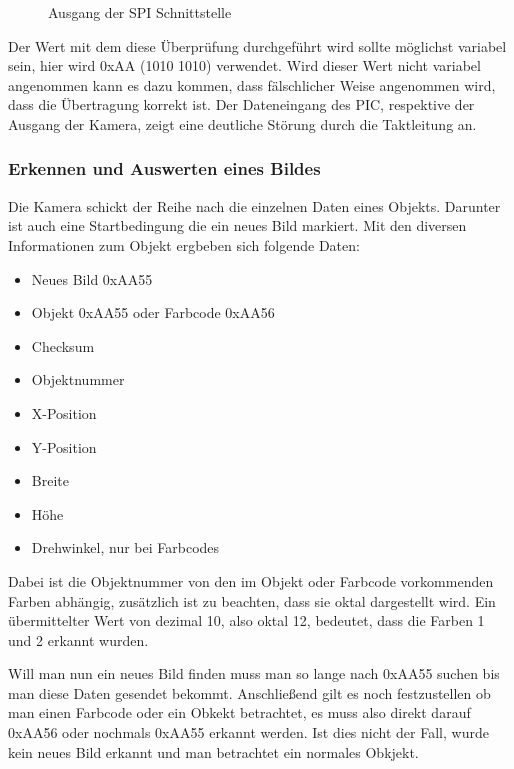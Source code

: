     \begin{figure}[tbh]
      \begin{centering}
      \par\end{centering}
      \caption{Ausgang der SPI Schnittstelle}
      \label{SPI-Ausgang}
    \end{figure}

    Der Wert mit dem diese Überprüfung durchgeführt wird sollte möglichst variabel sein, hier wird 0xAA (1010 1010) verwendet. Wird dieser Wert nicht variabel angenommen kann es dazu kommen, dass fälschlicher Weise angenommen wird, dass die Übertragung korrekt ist.
    Der Dateneingang des PIC, respektive der Ausgang der Kamera, zeigt eine deutliche Störung durch die Taktleitung an.

    \subsubsection{Erkennen und Auswerten eines Bildes}
    Die Kamera schickt der Reihe nach die einzelnen Daten eines Objekts. Darunter ist auch eine Startbedingung die ein neues Bild markiert. Mit den diversen Informationen zum Objekt ergbeben sich folgende Daten:
    \begin{itemize}
      \item Neues Bild 0xAA55
      \item Objekt 0xAA55 oder Farbcode 0xAA56
      \item Checksum
      \item Objektnummer
      \item X-Position
      \item Y-Position
      \item Breite
      \item Höhe
      \item Drehwinkel, nur bei Farbcodes
    \end{itemize}
    Dabei ist die Objektnummer von den im Objekt oder Farbcode vorkommenden Farben abhängig, zusätzlich ist zu beachten, dass sie oktal dargestellt wird. Ein übermittelter Wert von dezimal 10, also oktal 12, bedeutet, dass die Farben 1 und 2 erkannt wurden.

    Will man nun ein neues Bild finden muss man so lange nach 0xAA55 suchen bis man diese Daten gesendet bekommt. Anschließend gilt es noch festzustellen ob man einen Farbcode oder ein Obkekt betrachtet, es muss also direkt darauf 0xAA56 oder nochmals 0xAA55 erkannt werden. Ist dies nicht der Fall, wurde kein neues Bild erkannt und man betrachtet ein normales Obkjekt.

